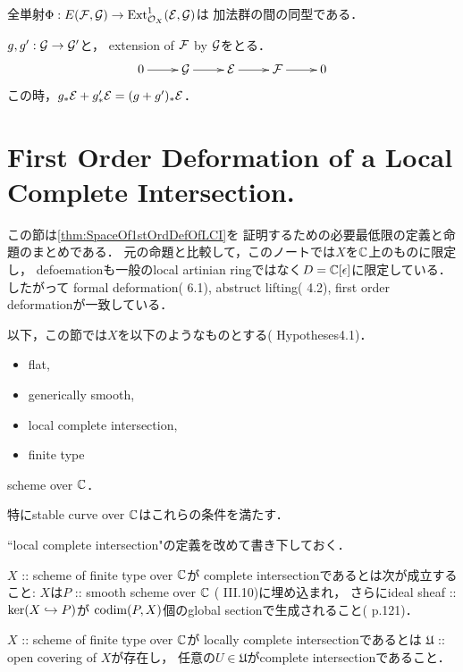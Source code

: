 \documentclass[a4paper]{jsarticle}
\newcommand{\cvU}{\mathfrak{U}}
\begin{document}
    \begin{Lemma}\label{lemma:PshiIsIso}
        全単射$\Phi: E(\mathcal{F}, \mathcal{G}) \to \operatorname{Ext}^1_{\mathcal{O}_X}(\mathcal{E}, \mathcal{G})$は
        加法群の間の同型である．
    \end{Lemma}

    \begin{Lemma}
        $g, g': \mathcal{G} \to \mathcal{G}'$と，
        extension of $\mathcal{F}$ by $\mathcal{G}$をとる．
        \[\xymatrix{
                0 \ar[r]& \shG \ar[r]& \shE \ar[r]& \shF \ar[r]& 0
        }\]
        この時，$g_*\mathcal{E}+g'_*\mathcal{E}=(g+g')_*\mathcal{E}$．
    \end{Lemma}

\section{First Order Deformation of a Local Complete Intersection.}
    この節は\ref{thm:SpaceOf1stOrdDefOfLCI}を
    証明するための必要最低限の定義と命題のまとめである．
    元の命題と比較して，このノートでは$X$を$\mathbb{C}$上のものに限定し，
    defoemationも一般のlocal artinian ringではなく$D=\mathbb{C}[\epsilon]$に限定している．
    したがって
    formal deformation(\cite{DefLCI} 6.1),
    abstruct lifting(\cite{DefLCI} 4.2), 
    first order deformationが一致している．

    以下，この節では$X$を以下のようなものとする(\cite{DefLCI} Hypotheses4.1)．
    \begin{screen}
    \begin{itemize}
        \item flat,
        \item generically smooth,
        \item local complete intersection,
        \item finite type
    \end{itemize}
        scheme over $\mathbb{C}$．
    \end{screen}
    特にstable curve over $\mathbb{C}$はこれらの条件を満たす．

    ``local complete intersection"の定義を改めて書き下しておく．
    \begin{Def}
        $X$ :: scheme of finite type over $\mathbb{C}$が
        complete intersectionであるとは次が成立すること:
        $X$は$P$ :: smooth scheme over $\mathbb{C}$ (\cite{HarAG} III.10)に埋め込まれ，
        さらにideal sheaf :: $\ker(X \hookrightarrow P)$が
        $\operatorname{codim}(P, X)$個のglobal sectionで生成されること(\cite{HarAG} p.121)．

        $X$ :: scheme of finite type over $\mathbb{C}$が
        locally complete intersectionであるとは
        $\cvU$ :: open covering of $X$が存在し，
        任意の$U \in \cvU$がcomplete intersectionであること．
    \end{Def}
    
\end{document}
